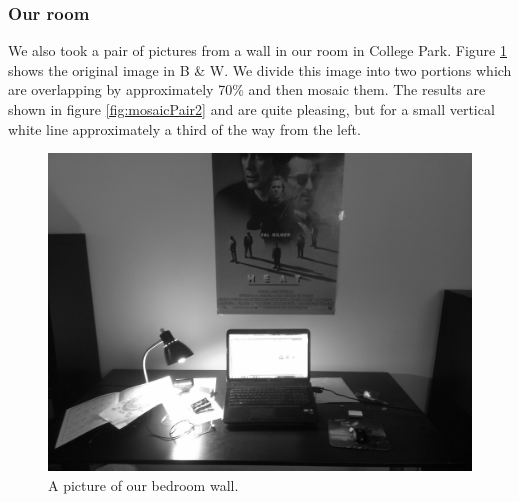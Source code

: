 \documentclass[11pt]{article} %
\begin{document}
\subsubsection{Our room}

We also took a pair of pictures from a wall in our room in College Park. Figure \ref{fig:roomImgOrig} shows the original image in B \& W. We divide this image into two portions which are overlapping by approximately 70\% and then mosaic them. The results are shown in figure \ref{fig:mosaicPair2} and are quite pleasing, but for a small vertical white line approximately a third of the way from the left. 

\begin{figure}[H]
	\centering
	\includegraphics[scale=.065]{figures/room_b_w}
	\caption{A picture of our bedroom wall.}
	\label{fig:roomImgOrig}
\end{figure}
\end{document}
